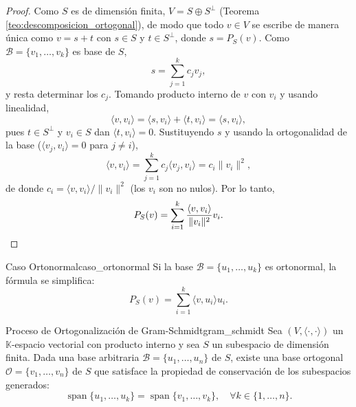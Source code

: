 \documentclass[11pt, a4paper]{article}
\begin{document}
\begin{proof}
Como $S$ es de dimensión finita, $V = S \oplus S^\perp$ (Teorema \ref{teo:descomposicion_ortogonal}), de modo que todo $v \in V$ se escribe de manera única como $v = s + t$ con $s \in S$ y $t \in S^\perp$, donde $s = P_S(v)$. Como $\mathcal{B} = \{v_1, \dots, v_k\}$ es base de $S$,
\[
s = \sum_{j=1}^{k} c_j v_j,
\]
y resta determinar los $c_j$. Tomando producto interno de $v$ con $v_i$ y usando linealidad,
\[
\langle v, v_i \rangle = \langle s, v_i \rangle + \langle t, v_i \rangle = \langle s, v_i \rangle,
\]
pues $t \in S^\perp$ y $v_i \in S$ dan $\langle t, v_i \rangle = 0$. Sustituyendo $s$ y usando la ortogonalidad de la base ($\langle v_j, v_i \rangle = 0$ para $j \neq i$),
\[
\langle v, v_i \rangle = \sum_{j=1}^{k} c_j \langle v_j, v_i \rangle = c_i \|v_i\|^2,
\]
de donde $c_i = \langle v, v_i \rangle / \|v_i\|^2$ (los $v_i$ son no nulos). Por lo tanto,
\[
P_S(v) = \sum_{i=1}^{k} \frac{\langle v, v_i \rangle}{\|v_i\|^2} v_i. \qedhere
\]
\end{proof}

\begin{corolario}{Caso Ortonormal}{caso_ortonormal}
Si la base $\mathcal{B} = \{u_1, \dots, u_k\}$ es ortonormal, la fórmula se simplifica:
\[
P_S(v) = \sum_{i=1}^{k} \langle v, u_i \rangle u_i.
\]
\end{corolario}

\begin{teorema}{Proceso de Ortogonalización de Gram-Schmidt}{gram_schmidt}
Sea $(V, \langle \cdot, \cdot \rangle)$ un $\mathbb{K}$-espacio vectorial con producto interno y sea $S$ un subespacio de dimensión finita.
Dada una base arbitraria $\mathcal{B} = \{u_1, \dots, u_n\}$ de $S$, existe una base ortogonal $\mathcal{O} = \{v_1, \dots, v_n\}$ de $S$ que satisface la propiedad de conservación de los subespacios generados:
\[
\operatorname{span}\{u_1, \dots, u_k\} = \operatorname{span}\{v_1, \dots, v_k\}, \quad \forall k \in \{1, \dots, n\}.
\]
\end{teorema}
\end{document}
